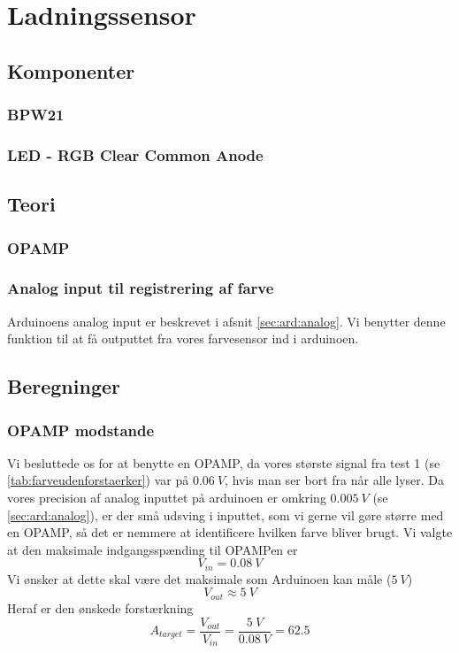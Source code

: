 \section{Ladningssensor}


\subsection{Komponenter}
\subsubsection{BPW21}

\subsubsection{LED - RGB Clear Common Anode}


\subsection{Teori}
\subsubsection{OPAMP}
\subsubsection{Analog input til registrering af farve}
Arduinoens analog input er beskrevet i afsnit \ref{sec:ard:analog}. Vi benytter denne funktion til at få outputtet fra vores farvesensor ind i arduinoen.
\subsection{Beregninger}
\subsubsection{OPAMP modstande} \label{subs:opampanalog}
Vi besluttede os for at benytte en OPAMP, da vores største signal fra test 1 (se \ref{tab:farveudenforstaerker}) var på $\SI{0.06}{V}$, hvis man ser bort fra når alle lyser. Da vores precision af analog inputtet på arduinoen er omkring $\SI{0.005}{V}$ (se \ref{sec:ard:analog}), er der små udsving i inputtet, som vi gerne vil gøre større med en OPAMP, så det er nemmere at identificere hvilken farve bliver brugt.
Vi valgte at den maksimale indgangsspænding til OPAMPen er
\[
	V_{in} = \SI{0.08}{V}
\]
Vi ønsker at dette skal være det maksimale som Arduinoen kan måle ($\SI{5}{V}$)
\[
	V_{out} \approx \SI{5}{V}
\]
Heraf er den ønskede forstærkning
\[
	A_{target} = \frac{V_{out}}{V_{in}} = \frac{\SI{5}{V}}{\SI{0.08}{V}}=62.5
\]

